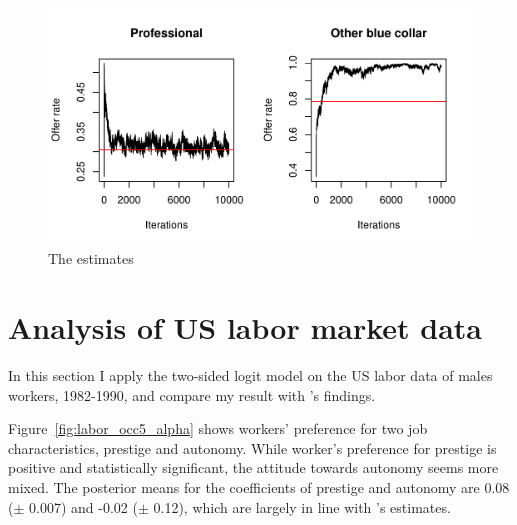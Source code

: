 \begin{figure}[tbp]
  \centering
  \includegraphics[width=\textwidth,keepaspectratio]{../figure/sim_labor_nojobs_nounemp_offer_rate}
  \caption[Estimates for the preference of a desirable and an undesirable firm.]{The estimates }
  \label{fig:sim_labor_nojobs_nounemp_offer_rate}
\end{figure}

\section{Analysis of US labor market data}
\label{sec:labor}

In this section I apply the two-sided logit model on the US labor data of males
workers, 1982-1990, and compare my result with \citet{Logan1996}'s findings.

Figure~\ref{fig:labor_occ5_alpha} shows workers' preference for two job
characteristics, prestige and autonomy. While worker's preference for prestige
is positive and statistically significant, the attitude towards autonomy seems
more mixed. The posterior means for the coefficients of prestige and autonomy
are 0.08 ($\pm$ 0.007) and -0.02 ($\pm$ 0.12), which are largely in line with
\citet{Logan1996}'s estimates.

